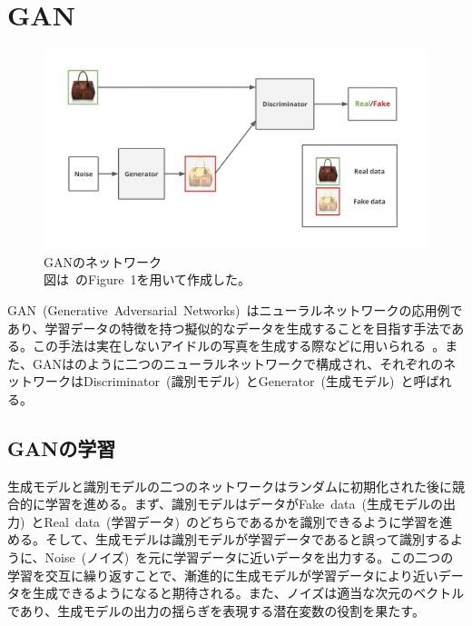 \clearpage

\section{GAN}

\begin{figure}[b]
\centering
\includegraphics[width=\columnwidth]{figure/GAN_net.png}
\caption[GANのネットワーク]{GANのネットワーク\\
図は~\cite{pix2pix}のFigure~1を用いて作成した。}
\label{fig:GAN_net}
\end{figure}

GAN~(Generative~Adversarial~Networks)~\cite{GAN}はニューラルネットワークの応用例であり、学習データの特徴を持つ擬似的なデータを生成することを目指す手法である。この手法は実在しないアイドルの写真を生成する際などに用いられる~\cite{idol}。また、GANはのように二つのニューラルネットワークで構成され、それぞれのネットワークはDiscriminator~(識別モデル)~とGenerator~(生成モデル)~と呼ばれる。

\subsection{GANの学習}

生成モデルと識別モデルの二つのネットワークはランダムに初期化された後に競合的に学習を進める。まず、識別モデルはデータがFake~data~(生成モデルの出力)~とReal~data~(学習データ)~のどちらであるかを識別できるように学習を進める。そして、生成モデルは識別モデルが学習データであると誤って識別するように、Noise~(ノイズ)~を元に学習データに近いデータを出力する。この二つの学習を交互に繰り返すことで、漸進的に生成モデルが学習データにより近いデータを生成できるようになると期待される。また、ノイズは適当な次元のベクトルであり、生成モデルの出力の揺らぎを表現する潜在変数の役割を果たす。

